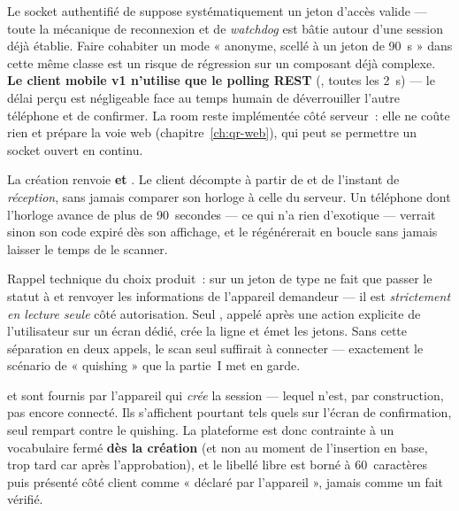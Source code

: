 \begin{alerte}
Le socket authentifié de  suppose systématiquement un jeton d'accès
valide --- toute la mécanique de reconnexion et de \emph{watchdog} est bâtie autour d'une
session déjà établie. Faire cohabiter un mode « anonyme, scellé à un jeton de 90~s » dans
cette même classe est un risque de régression sur un composant déjà complexe. \textbf{Le
client mobile v1 n'utilise que le polling REST} (,
toutes les 2~s) --- le délai perçu est négligeable face au temps humain de déverrouiller
l'autre téléphone et de confirmer. La room  reste
implémentée côté serveur~: elle ne coûte rien et prépare la voie web
(chapitre~\ref{ch:qr-web}), qui peut se permettre un socket ouvert en continu.
\end{alerte}

\begin{note}
La création renvoie  \textbf{et} . Le client décompte à partir
de  et de l'instant de \emph{réception}, sans jamais comparer son horloge à
celle du serveur. Un téléphone dont l'horloge avance de plus de 90~secondes --- ce qui
n'a rien d'exotique --- verrait sinon son code expiré dès son affichage, et le
régénérerait en boucle sans jamais laisser le temps de le scanner.
\end{note}

\begin{alerte}
Rappel technique du choix produit~:  sur un jeton de type
 ne fait que passer le statut à  et renvoyer les informations de
l'appareil demandeur --- il est \emph{strictement en lecture seule} côté autorisation. Seul
, appelé après une action explicite de
l'utilisateur sur un écran dédié, crée la ligne  et émet les jetons. Sans
cette séparation en deux appels, le scan seul suffirait à connecter --- exactement le
scénario de « quishing » que la partie~I met en garde.
\end{alerte}

\begin{alerte}
 et  sont fournis par l'appareil qui \emph{crée} la
session --- lequel n'est, par construction, pas encore connecté. Ils s'affichent pourtant
tels quels sur l'écran de confirmation, seul rempart contre le quishing. La plateforme est
donc contrainte à un vocabulaire fermé \textbf{dès la création} (et non au moment de
l'insertion en base, trop tard car après l'approbation), et le libellé libre est borné à
60~caractères puis présenté côté client comme « déclaré par l'appareil », jamais comme un
fait vérifié.
\end{alerte}

